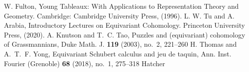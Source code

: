 \begin{thebibliography}{99}
  
   W. Fulton, Young Tableaux: With Applications to Representation Theory and Geometry. Cambridge: Cambridge University Press, (1996).
   L. W. Tu and A. Arabia, Introductory Lectures on Equivariant Cohomology. Princeton University Press, (2020).
   A. Knutson and T.~C. Tao, Puzzles and (equivariant) cohomology of Grassmannians, Duke Math. J. {\bf 119} (2003), no.~2, 221--260 
   H. Thomas and A.~T.~F. Yong, Equivariant Schubert calculus and jeu de taquin, Ann. Inst. Fourier (Grenoble) {\bf 68} (2018), no.~1, 275--318
   Hatcher

\end{thebibliography}